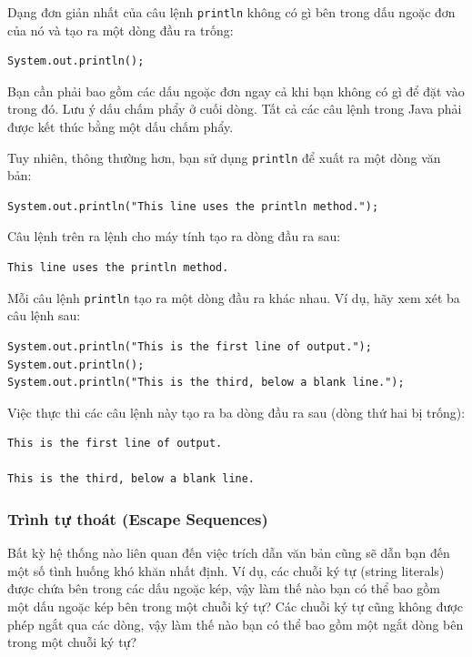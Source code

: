 Dạng đơn giản nhất của câu lệnh \texttt{println} không có gì bên trong
dấu ngoặc đơn của nó và tạo ra một dòng đầu ra trống:

\begin{verbatim}
System.out.println();
\end{verbatim}

Bạn cần phải bao gồm các dấu ngoặc đơn ngay cả khi bạn không có gì để
đặt vào trong đó. Lưu ý dấu chấm phẩy ở cuối dòng. Tất cả các câu lệnh
trong Java phải được kết thúc bằng một dấu chấm phẩy.

Tuy nhiên, thông thường hơn, bạn sử dụng \texttt{println} để xuất ra một
dòng văn bản:

\begin{verbatim}
System.out.println("This line uses the println method.");
\end{verbatim}

Câu lệnh trên ra lệnh cho máy tính tạo ra dòng đầu ra sau:

\begin{verbatim}
This line uses the println method.
\end{verbatim}

Mỗi câu lệnh \texttt{println} tạo ra một dòng đầu ra khác nhau. Ví dụ,
hãy xem xét ba câu lệnh sau:

\begin{verbatim}
System.out.println("This is the first line of output.");
System.out.println();
System.out.println("This is the third, below a blank line.");
\end{verbatim}

Việc thực thi các câu lệnh này tạo ra ba dòng đầu ra sau (dòng thứ hai
bị trống):

\begin{verbatim}
This is the first line of output. 

This is the third, below a blank line.
\end{verbatim}

\subsubsection{Trình tự thoát (Escape
Sequences)}\label{truxecnh-tux1ef1-thouxe1t-escape-sequences}

Bất kỳ hệ thống nào liên quan đến việc trích dẫn văn bản cũng sẽ dẫn bạn
đến một số tình huống khó khăn nhất định. Ví dụ, các chuỗi ký tự (string
literals) được chứa bên trong các dấu ngoặc kép, vậy làm thế nào bạn có
thể bao gồm một dấu ngoặc kép bên trong một chuỗi ký tự? Các chuỗi ký tự
cũng không được phép ngắt qua các dòng, vậy làm thế nào bạn có thể bao
gồm một ngắt dòng bên trong một chuỗi ký tự?


